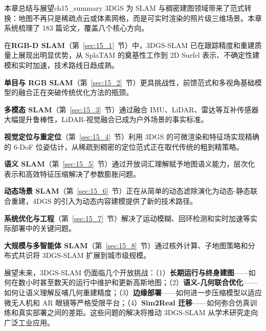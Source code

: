 \begin{futurebox}{本章总结与展望}{ch15_summary}
3DGS 为 SLAM 与稠密建图领域带来了范式转换：地图不再只是稀疏点云或体素网格，而是可实时渲染的照片级三维场景。本章系统梳理了 183 篇论文，覆盖八个核心方向。

在\textbf{RGB-D SLAM}（第~\ref{sec:15_1}~节）中，3DGS-SLAM 已在跟踪精度和重建质量上展现出明显优势，从 SplaTAM 的奠基性工作到 2D Surfel 表示、不确定性建模和实时加速，技术路线日趋成熟。

\textbf{单目与 RGB SLAM}（第~\ref{sec:15_2}~节）更具挑战性，前馈范式和多视角基础模型的融合正在突破传统优化方法的瓶颈。

\textbf{多模态 SLAM}（第~\ref{sec:15_3}~节）通过融合 IMU、LiDAR、雷达等互补传感器大幅提升鲁棒性，LiDAR-视觉融合已成为户外场景的事实标准。

\textbf{视觉定位与重定位}（第~\ref{sec:15_4}~节）利用 3DGS 的可微渲染和特征场实现精确的 6-DoF 位姿估计，从稀疏到稠密的定位范式正在取代传统的粗到精策略。

\textbf{语义 SLAM}（第~\ref{sec:15_5}~节）通过开放词汇理解赋予地图语义能力，层次化表示和高效特征压缩解决了参数膨胀问题。

\textbf{动态场景 SLAM}（第~\ref{sec:15_6}~节）正在从简单的动态滤除演化为动态-静态联合重建，4DGS 的引入为动态内容建模提供了新的技术路径。

\textbf{系统优化与工程}（第~\ref{sec:15_7}~节）解决了运动模糊、回环检测和实时加速等实际部署中的关键问题。

\textbf{大规模与多智能体 SLAM}（第~\ref{sec:15_8}~节）通过核外计算、子地图策略和分布式共识将 3DGS-SLAM 扩展到城市级规模。

展望未来，3DGS-SLAM 仍面临几个开放挑战：（1）\textbf{长期运行与终身建图}——如何在数小时甚至数天的运行中维护和更新高斯地图；（2）\textbf{语义-几何联合优化}——如何让语义理解反哺几何重建精度；（3）\textbf{边缘部署}——如何进一步压缩模型以适应微无人机和 AR 眼镜等严格受限平台；（4）\textbf{Sim2Real 迁移}——如何弥合仿真训练和真实部署之间的差距。这些问题的解决将推动 3DGS-SLAM 从学术研究走向广泛工业应用。
\end{futurebox}
